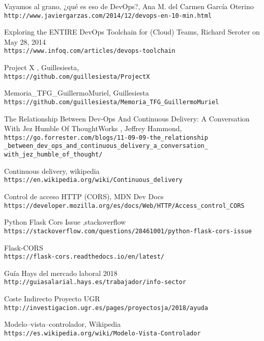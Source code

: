 \begin{thebibliography}{999}
 Vayamos al grano, ¿qué es eso de DevOps?,  Ana M. del Carmen García Oterino
\\\texttt{http://www.javiergarzas.com/2014/12/devops-en-10-min.html}

 Exploring the ENTIRE DevOps Toolchain for (Cloud) Teams,  Richard Seroter on May 28, 2014
\\\texttt{https://www.infoq.com/articles/devops-toolchain}

Project X , Guillesiesta,
\\\texttt{https://github.com/guillesiesta/ProjectX}

Memoria\_TFG\_GuillermoMuriel, Guillesiesta
\\\texttt{https://github.com/guillesiesta/Memoria_TFG_GuillermoMuriel}

The Relationship Between Dev-Ops And Continuous Delivery: A Conversation With Jez Humble Of ThoughtWorks , Jeffrey Hammond,
\\\texttt{https://go.forrester.com/blogs/11-09-09-the\_relationship
\_between\_dev\_ops\_and\_continuous\_delivery\_a\_conversation\_
with\_jez\_humble\_of\_thought/}

Continuous delivery, wikipedia
\\\texttt{https://en.wikipedia.org/wiki/Continuous\_delivery}

Control de acceso HTTP (CORS), MDN Dev Docs
\\\texttt{https://developer.mozilla.org/es/docs/Web/HTTP/Access\_control\_CORS}


Python Flask Cors Issue ,stackoverflow
\\\texttt{https://stackoverflow.com/questions/28461001/python-flask-cors-issue}

Flask-CORS
\\\texttt{https://flask-cors.readthedocs.io/en/latest/}

Guía Hays del mercado laboral 2018
\\\texttt{http://guiasalarial.hays.es/trabajador/info-sector}

Coste Indirecto Proyecto UGR
\\\texttt{http://investigacion.ugr.es/pages/proyectosja/2018/ayuda}


Modelo–vista–controlador, Wikipedia
\\\texttt{https://es.wikipedia.org/wiki/Modelo-Vista-Controlador}


\end{thebibliography}

